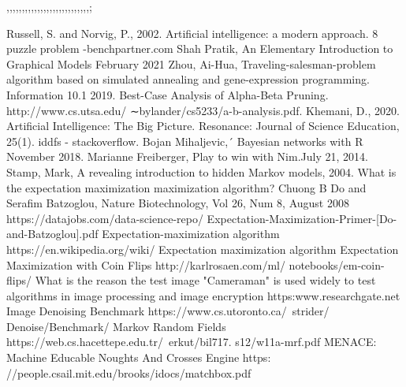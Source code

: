 ,,,,,,,,,,,,,,,,,,,,,,,,,,,;\documentclass[conference]{IEEEtran}
\begin{document}
\begin{thebibliography}{00}
 Russell, S. and Norvig, P., 2002. Artificial intelligence: a modern approach.
8 puzzle problem -benchpartner.com
Shah Pratik, An Elementary Introduction to Graphical Models February
2021
Zhou, Ai-Hua, Traveling-salesman-problem algorithm based on simulated annealing and gene-expression programming. Information 10.1 2019.
 Best-Case Analysis of Alpha-Beta Pruning. http://www.cs.utsa.edu/ ∼bylander/cs5233/a-b-analysis.pdf.
 Khemani, D., 2020. Artificial Intelligence: The Big Picture. Resonance: Journal of Science Education, 25(1).
iddfs - stackoverflow.
Bojan Mihaljevic,´ Bayesian networks with R November 2018.
Marianne Freiberger, Play to win with Nim.July 21, 2014.
 Stamp, Mark, A revealing introduction to hidden Markov models, 2004.
 What is the expectation maximization
maximization algorithm? Chuong B Do and Serafim Batzoglou, Nature Biotechnology, Vol 26, Num 8, August 2008 https://datajobs.com/data-science-repo/
Expectation-Maximization-Primer-[Do-and-Batzoglou].pdf
 Expectation-maximization algorithm https://en.wikipedia.org/wiki/
Expectation maximization algorithm
 Expectation Maximization with Coin Flips http://karlrosaen.com/ml/
notebooks/em-coin-flips/
 What is the reason the test image "Cameraman" is used widely
to test algorithms in image processing and image encryption\?
https:\/\/www.researchgate.net\/
 Image Denoising Benchmark https://www.cs.utoronto.ca/~strider/
Denoise/Benchmark/
 Markov Random Fields https://web.cs.hacettepe.edu.tr/~erkut/bil717.
s12/w11a-mrf.pdf
 MENACE: Machine Educable Noughts And Crosses Engine https:
//people.csail.mit.edu/brooks/idocs/matchbox.pdf
\end{thebibliography}
\vspace{12pt}
\end{document}
